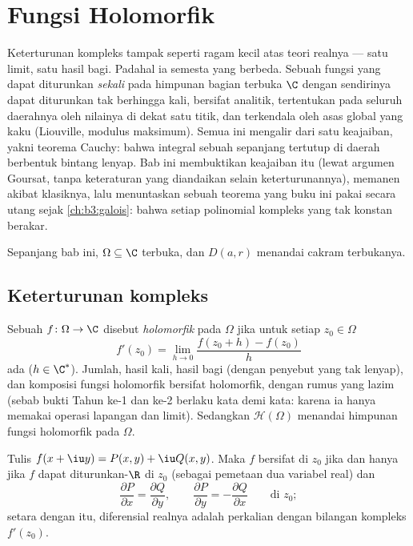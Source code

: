 \chapter{Fungsi Holomorfik}\label{ch:b3:holomorphic}

Keterturunan kompleks tampak seperti ragam kecil atas
teori realnya --- satu limit, satu hasil bagi. Padahal ia
semesta yang berbeda. Sebuah fungsi yang dapat diturunkan \emph{sekali} pada
himpunan bagian terbuka $\C$ dengan sendirinya dapat diturunkan tak berhingga kali,
bersifat analitik, tertentukan pada seluruh daerahnya oleh nilainya di dekat
satu titik, dan terkendala oleh asas global yang kaku
(Liouville, modulus maksimum). Semua ini mengalir dari satu
keajaiban, yakni teorema Cauchy: bahwa integral sebuah  sepanjang  tertutup di daerah berbentuk bintang lenyap.
Bab ini membuktikan keajaiban itu (lewat argumen Goursat, tanpa
keteraturan yang diandaikan selain keterturunannya), memanen
akibat klasiknya, lalu menuntaskan sebuah teorema yang buku ini
pakai secara utang sejak \cref{ch:b3:galois}: bahwa setiap
polinomial kompleks yang tak konstan berakar.

Sepanjang bab ini, $\Omega \subseteq \C$ terbuka, dan $D(a, r)$
menandai cakram terbukanya.

\section{Keterturunan kompleks}

\begin{definition}\label{def:b3:holomorphic:holo}
Sebuah $f \colon \Omega \to \C$ disebut \emph{holomorfik} pada $\Omega$ jika untuk setiap $z_0 \in \Omega$
\[
f'(z_0) = \lim_{h\to0}\frac{f(z_0 + h) - f(z_0)}{h}
\]
ada ($h \in \C^*$). Jumlah, hasil kali, hasil bagi (dengan penyebut
yang tak lenyap), dan komposisi fungsi holomorfik bersifat
holomorfik, dengan rumus yang lazim (sebab bukti Tahun ke-1 dan ke-2 berlaku
kata demi kata: karena ia hanya memakai operasi lapangan dan limit).
Sedangkan $\mathcal H(\Omega)$ menandai himpunan fungsi holomorfik
pada $\Omega$.
\end{definition}

\begin{proposition}
\label{prop:b3:holomorphic:cauchyriemann}
Tulis $f(x + \iu y) = P(x,y) + \iu Q(x,y)$. Maka $f$ bersifat
 di $z_0$ jika dan hanya jika $f$ dapat diturunkan-$\R$ di $z_0$
(sebagai pemetaan dua variabel real) dan
\[
\frac{\partial P}{\partial x} = \frac{\partial Q}{\partial y},
\qquad
\frac{\partial P}{\partial y} = -\frac{\partial Q}{\partial x}
\qquad \text{di } z_0 ;
\]
setara dengan itu, diferensial realnya adalah perkalian dengan
bilangan kompleks $f'(z_0)$.
\end{proposition}

